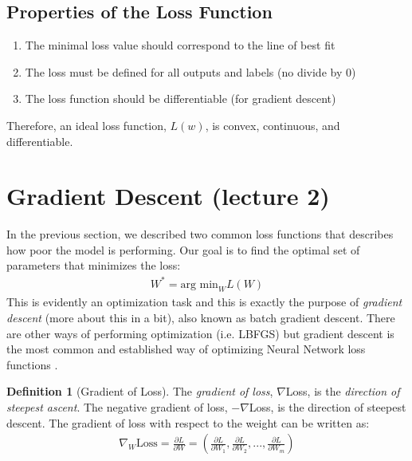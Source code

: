 \documentclass[11pt]{article}
\numberwithin{equation}{section}
\theoremstyle{definition}%
\newtheorem{definition}{Definition}[section]%
\begin{document}
\subsection{Properties of the Loss Function}

\begin{enumerate}
    \item {The minimal loss value should correspond to the line of best fit}
    \item {The loss must be defined for all outputs and labels (no divide by 0)}
    \item {The loss function should be differentiable (for gradient descent)}
\end{enumerate}

Therefore, an ideal loss function, $L(w)$, is convex, continuous, and differentiable.

\section{Gradient Descent (lecture 2)}

In the previous section, we described two common loss functions that describes how poor the model is performing. Our goal is to find the optimal set of parameters that minimizes the loss:
\begin{align}
    W^{\ast} = \text{arg min}_{W} L(W)
\end{align}
This is evidently an optimization task and this is exactly the purpose of \emph{gradient descent} (more about this in a bit), also known as batch gradient descent. There are other ways of performing optimization (i.e. LBFGS) but gradient descent is the most common and established way of optimizing Neural Network loss functions \cite{Stanford}.

\begin{definition}[Gradient of Loss]
    The \emph{gradient of loss}, $\nabla$Loss, is the \emph{direction of steepest ascent}. The negative gradient of loss, $-\nabla$Loss, is the direction of steepest descent. The gradient of loss with respect to the weight can be written as:
    \begin{align}
        \nabla_W \text{Loss} = \frac{\partial L}{\partial W} = \left( \frac{\partial L}{\partial W_1}, \frac{\partial L}{\partial W_2}, ..., \frac{\partial L}{\partial W_m} \right)
    \end{align}
\end{definition}
\end{document}

